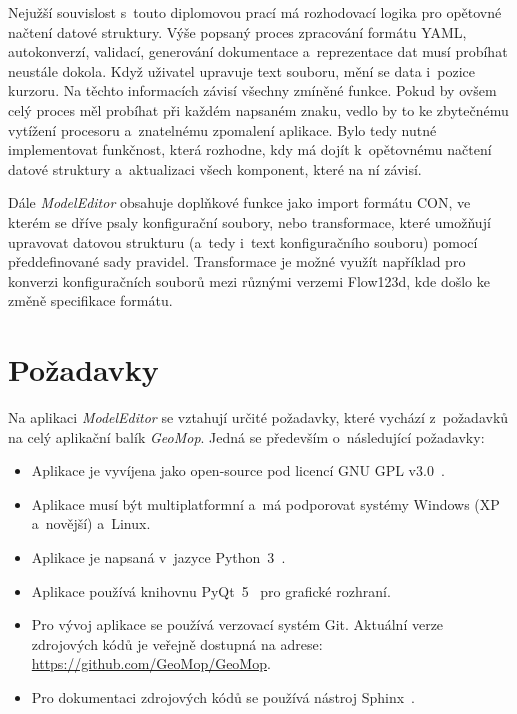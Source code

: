 \documentclass[FM,bw,DP]{tulthesis}
\begin{document}
Nejužší souvislost s~touto diplomovou prací má rozhodovací logika pro opětovné načtení datové struktury. Výše popsaný proces zpracování formátu \gls{YAML}, autokonverzí, validací, generování dokumentace a~reprezentace dat musí probíhat neustále dokola. Když uživatel upravuje text souboru, mění se data i~pozice kurzoru. Na těchto informacích závisí všechny zmíněné funkce. Pokud by ovšem celý proces měl probíhat při každém napsaném znaku, vedlo by to ke zbytečnému vytížení procesoru a~znatelnému zpomalení aplikace. Bylo tedy nutné implementovat funkčnost, která rozhodne, kdy má dojít k~opětovnému načtení datové struktury a~aktualizaci všech komponent, které na ní závisí.

Dále \textit{ModelEditor} obsahuje doplňkové funkce jako import formátu CON, ve kterém se dříve psaly konfigurační soubory, nebo transformace, které umožňují upravovat datovou strukturu (a~tedy i~text konfiguračního souboru) pomocí předdefi\-no\-va\-né sady pravidel. Transformace je možné využít například pro konverzi konfiguračních souborů mezi různými verzemi Flow123d, kde došlo ke změně specifikace formátu.


\section{Požadavky}

Na aplikaci \textit{ModelEditor} se vztahují určité požadavky, které vychází z~požadavků na celý aplikační balík \textit{GeoMop}. Jedná se především o~následující požadavky:

\begin{itemize}
\item Aplikace je vyvíjena jako open-source pod licencí \acrshort{GNU} \gls{GPL} v3.0~\cite{bib:gnu-gpl3}.
\item Aplikace musí být multiplatformní a~má podporovat systémy Windows (XP a~novější) a~Linux.
\item Aplikace je napsaná v~jazyce Python~3~\cite{bib:python3}.
\item Aplikace používá knihovnu PyQt~5~\cite{bib:pyqt5} pro grafické rozhraní.
\item Pro vývoj aplikace se používá verzovací systém Git. Aktuální verze zdrojových kódů je veřejně dostupná na adrese: \url{https://github.com/GeoMop/GeoMop}.
\item Pro dokumentaci zdrojových kódů se používá nástroj Sphinx~\cite{bib:sphinx}.
\end{itemize}
\end{document}
